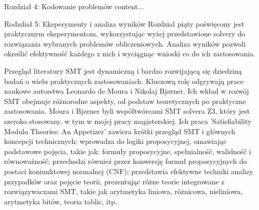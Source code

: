 \documentclass{beamer}
\begin{document}
	
	\begin{frame}{Rozdział 4: Kodowanie problemów}
		content...
	\end{frame}
	
	
	\begin{frame}{Rodzdiał 5: Eksperymenty i analiza wyników}
		Rozdział piąty poświęcony jest praktycznym eksperymentom, wykorzystując wyżej przedstawione solvery  do rozwiązania wybranych problemów obliczeniowych. Analiza wyników pozwoli określić efektywność każdego z nich i wyciągnąc wnioski co do ich zastosowania.
	\end{frame}
	
	
	\begin{frame}{Przegląd literatury}
		SMT jest dynamiczną i bardzo rozwijającą się dziedziną badań o wielu praktycznych zastosowaniach. 
		Kluczową rolę odgrywają prace naukowe autorstwa Leonardo de Moura  i Nikolaj Bjørner. Ich wkład w rozwój SMT obejmuje różnorodne aspekty,  od podstaw teoretycznych po praktyczne zastosowania.
		Moura i Bjørner byli współtwórcami SMT solvera Z3, który jest szeroko stosowany, w tym w mojej pracy magisterskiej. 
		Ich praca 'Satisfiability Modulo Theories: An Appetizer' zawiera krótki przegląd SMT i głównych koncepcji technicznych: wprowadza do logiki proposycyjnej, omawiając podstawowe pojęcia, takie jak: formuły proposycyjne, spełnialność, walidność i równoważność; przechodzi również przez konwersję formuł proposycyjnych do postaci koniunktowej normalnej (CNF); przedstawia efektywne techniki analizy przypadków oraz pojęcie teorii, prezentując różne teorie integrowane z rozwiązywaczami SMT, takie jak arytmetyka liniowa, różnicowa, nieliniowa, arytmetyka bitów, teoria tablic, itp.
	\end{frame}
	
	
\end{document}
